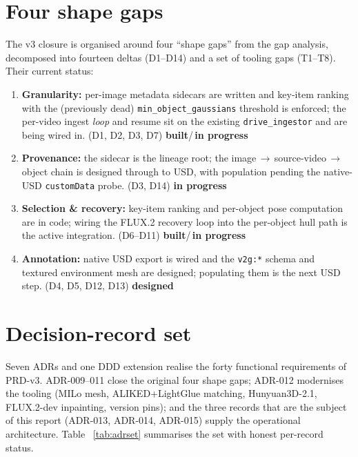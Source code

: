 \documentclass[a4paper,11pt]{report}
\newcommand{\chip}[2]{\textcolor{#1}{\textbf{#2}}}
\newcommand{\code}[1]{\texttt{#1}}
\newcommand{\built}{\chip{SuccessGreen}{built}}
\newcommand{\wip}{\chip{WarningAmber}{in progress}}
\newcommand{\designed}{\chip{MidGrey}{designed}}
\begin{document}
\section{Four shape gaps}
The v3 closure is organised around four ``shape gaps'' from the gap analysis, decomposed into fourteen
deltas (D1--D14) and a set of tooling gaps (T1--T8). Their current status:

\begin{enumerate}
  \item \textbf{Granularity:} per-image metadata sidecars are written and key-item ranking with the
  (previously dead) \code{min\_object\_gaussians} threshold is enforced; the per-video ingest \emph{loop}
  and resume sit on the existing \code{drive\_ingestor} and are being wired in. (D1, D2, D3, D7) \built/\,\wip
  \item \textbf{Provenance:} the sidecar is the lineage root; the
  image\,$\rightarrow$\,source-video\,$\rightarrow$\,object chain is designed through to USD, with
  population pending the native-USD \code{customData} probe. (D3, D14) \wip
  \item \textbf{Selection \& recovery:} key-item ranking and per-object pose computation are in code;
  wiring the FLUX.2 recovery loop into the per-object hull path is the active integration. (D6--D11)
  \built/\,\wip
  \item \textbf{Annotation:} native USD export is wired and the \code{v2g:*} schema and textured
  environment mesh are designed; populating them is the next USD step. (D4, D5, D12, D13) \designed
\end{enumerate}

\section{Decision-record set}
Seven ADRs and one DDD extension realise the forty functional requirements of PRD-v3. ADR-009--011
close the original four shape gaps; ADR-012 modernises the tooling (MILo mesh, ALIKED+LightGlue
matching, Hunyuan3D-2.1, FLUX.2-dev inpainting, version pins); and the three records that are the
subject of this report (ADR-013, ADR-014, ADR-015) supply the operational architecture. Table~%
\ref{tab:adrset} summarises the set with honest per-record status.
\end{document}
